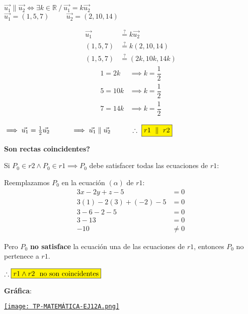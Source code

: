 \begin{center}
	$\vec{u_1} \parallel \vec{u_2} \iff \exists k \in \mathbb{R} \ / \ \vec{u_1} = k\vec{u_2}$ \\
	\vspace{0.3cm}
	$\vec{u_1} = (1, 5, 7) \hspace{1cm} \vec{u_2} = (2, 10, 14)$
\end{center}

\begin{multicols}{2}
	\begin{align*}
		\vec{u_1} & \overset{?}{=} k\vec{u_2}     \\
		(1, 5, 7) & \overset{?}{=} k(2, 10, 14)   \\
		(1, 5, 7) & \overset{?}{=} (2k, 10k, 14k)
	\end{align*}
	\columnbreak
	\begin{align*}
		1 = 2k  & \implies k = \dfrac{1}{2} \\
		5 = 10k & \implies k = \dfrac{1}{2} \\
		7 = 14k & \implies k = \dfrac{1}{2}
	\end{align*}
\end{multicols}
\begin{center}
	$\implies \vec{u_1} = \frac{1}{2}\vec{u_2} \hspace{1cm} \implies \vec{u_1} \parallel \vec{u_2} \hspace{1cm} \therefore \ \fcolorbox{black}{yellow}{$r1 \ \parallel \ r2$}$
\end{center}

\vspace{1cm}
\noindent \textbf{Son rectas coincidentes?}

\noindent Si $P_0 \in r2 \land P_0 \in r1 \implies P_0$ debe satisfacer todas las ecuaciones de $r1$:

\noindent Reemplazamos $P_0$ en la ecuación $(\alpha)$ de $r1$:
\begin{align*}
	3x - 2y + z - 5        & = 0    \\
	3(1) - 2(3) + (-2) - 5 & = 0    \\
	3 - 6 -2 - 5           & = 0    \\
	3 - 13                 & = 0    \\
	-10                    & \neq 0
\end{align*}

\noindent Pero $P_0$ \textbf{no satisface} la ecuación una de las ecuaciones de $r1$, entonces $P_0$ no pertenece a $r1$.
\begin{center}
	$\therefore \fcolorbox{black}{yellow}{$r1 \land r2 \ \ \text{no son coincidentes}$}$
\end{center}

\vspace{1cm}
\noindent \textbf{Gráfica}:
\begin{center}
	\href{https://www.geogebra.org/3d/yqkppcut}{\texttt{[image: TP-MATEMÁTICA-EJ12A.png]}}
\end{center}

